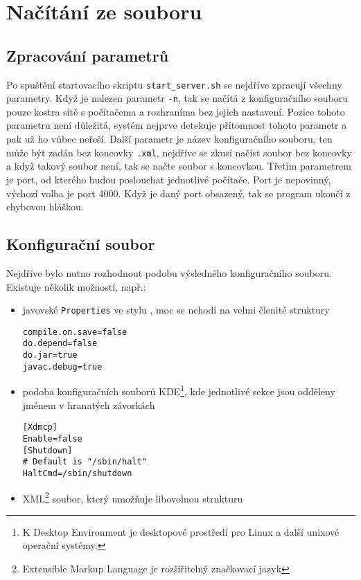 \section{Načítání ze souboru} \label{xml_soubor}
\subsection{Zpracování parametrů}
Po spuštění startovacího skriptu \verb|start_server.sh| se nejdříve zpracují všechny parametry. Když je nalezen parametr \verb|-n|, tak se načítá z konfiguračního souboru pouze kostra sítě s počítačema a rozhraníma bez jejich nastavení. Pozice tohoto parametru není důležitá, systém nejprve detekuje přítomnost tohoto parametr a pak už ho vůbec neřeší. Další parametr je název konfiguračního souboru, ten může být zadán bez koncovky \verb|.xml|, nejdříve se zkusí načíst soubor bez koncovky a když takový soubor není, tak se načte soubor s koncovkou. Třetím parametrem je port, od kterého budou poslouchat jednotlivé počítače. Port je nepovinný, výchozí volba je port 4000. Když je daný port obsazený, tak se program ukončí z chybovou hláškou.


\subsection{Konfigurační soubor}
Nejdříve bylo nutno rozhodnout podobu výsledného konfiguračního souboru. Existuje několik možností, např.:
\begin{itemize}
 \item javovské \verb|Properties| ve stylu , moc se nehodí na velmi členité struktury
\begin{verbatim}
compile.on.save=false
do.depend=false
do.jar=true
javac.debug=true
\end{verbatim} 

 \item podoba konfiguračních souborů KDE\footnote{K Desktop Environment je desktopové prostředí pro Linux a další unixové operační systémy.}, kde jednotlivé sekce jsou odděleny jménem v hranatých závorkách
\begin{verbatim}
[Xdmcp]
Enable=false
[Shutdown]
# Default is "/sbin/halt"
HaltCmd=/sbin/shutdown
\end{verbatim} 

 \item XML\footnote{Extensible Markup Language je rozšiřitelný značkovací jazyk} soubor, který umožňuje libovolnou strukturu
\end{itemize}

